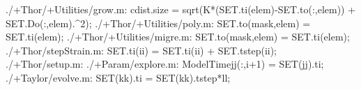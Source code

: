 ./+Thor/+Utilities/grow.m:    cdist.size = sqrt(K*(SET.ti(elem)-SET.to(:,elem)) + SET.Do(:,elem).^2);
./+Thor/+Utilities/poly.m:        SET.to(mask,elem) = SET.ti(elem);
./+Thor/+Utilities/migre.m:            SET.to(mask,elem) = SET.ti(elem);
./+Thor/stepStrain.m:        SET.ti(ii) = SET.ti(ii) + SET.tstep(ii);
./+Thor/setup.m:%
./+Param/explore.m:                ModelTime{jj}(:,i+1) = SET(jj).ti;
./+Taylor/evolve.m:            SET(kk).ti = SET(kk).tstep*ll;
